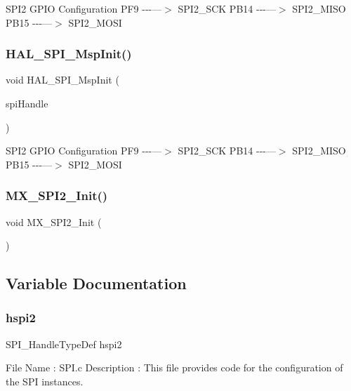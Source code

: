 S\+P\+I2 G\+P\+IO Configuration P\+F9 -\/-\/-\/---$>$ S\+P\+I2\+\_\+\+S\+CK P\+B14 -\/-\/-\/---$>$ S\+P\+I2\+\_\+\+M\+I\+SO P\+B15 -\/-\/-\/---$>$ S\+P\+I2\+\_\+\+M\+O\+SI\mbox{\label{spi_8c_a8e1dadd744299fa6f8bca0e1bcbd2c00}} 
\subsubsection{H\+A\+L\+\_\+\+S\+P\+I\+\_\+\+Msp\+Init()}
{\footnotesize\ttfamily void H\+A\+L\+\_\+\+S\+P\+I\+\_\+\+Msp\+Init (\begin{DoxyParamCaption}\item[{S\+P\+I\+\_\+\+Handle\+Type\+Def $\ast$}]{spi\+Handle }\end{DoxyParamCaption})}

S\+P\+I2 G\+P\+IO Configuration P\+F9 -\/-\/-\/---$>$ S\+P\+I2\+\_\+\+S\+CK P\+B14 -\/-\/-\/---$>$ S\+P\+I2\+\_\+\+M\+I\+SO P\+B15 -\/-\/-\/---$>$ S\+P\+I2\+\_\+\+M\+O\+SI\mbox{\label{spi_8c_aea85daa666c03d85fd59edef711ebb08}} 
\subsubsection{M\+X\+\_\+\+S\+P\+I2\+\_\+\+Init()}
{\footnotesize\ttfamily void M\+X\+\_\+\+S\+P\+I2\+\_\+\+Init (\begin{DoxyParamCaption}\item[{void}]{ }\end{DoxyParamCaption})}



\subsection{Variable Documentation}
\mbox{\label{spi_8c_ab9da65f935e805137e2eb4e18c5ab224}} 
\subsubsection{hspi2}
{\footnotesize\ttfamily S\+P\+I\+\_\+\+Handle\+Type\+Def hspi2}

File Name \+: S\+P\+I.\+c Description \+: This file provides code for the configuration of the S\+PI instances.

